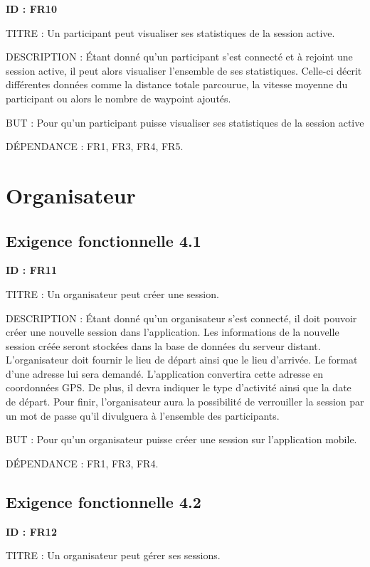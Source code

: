 \documentclass[titlepage, 12pt]{report}
\begin{document}
\textbf{ID : FR10}

TITRE : Un participant peut visualiser ses statistiques de la session active.

DESCRIPTION : Étant donné qu'un participant s'est connecté et à rejoint une session active, il peut alors visualiser l'ensemble de ses statistiques. Celle-ci décrit différentes données comme la distance totale parcourue, la vitesse moyenne du participant ou alors le nombre de waypoint ajoutés. 

BUT : Pour qu'un participant puisse visualiser ses statistiques de la session active

DÉPENDANCE : FR1, FR3, FR4, FR5.



\section{Organisateur}

\subsection{Exigence fonctionnelle 4.1}

\textbf{ID : FR11}

TITRE : Un organisateur peut créer une session.

DESCRIPTION : Étant donné qu'un organisateur s'est connecté, il doit pouvoir créer une nouvelle session dans l'application. Les informations de la nouvelle session créée seront stockées dans la base de données du serveur distant. L'organisateur doit fournir le lieu de départ ainsi que le lieu d'arrivée. Le format d'une adresse lui sera demandé. L'application convertira cette adresse en coordonnées GPS. De plus, il devra indiquer le type d'activité ainsi que la date de départ. Pour finir, l'organisateur aura la possibilité de verrouiller la session par un mot de passe qu'il divulguera à l'ensemble des participants.

BUT : Pour qu'un organisateur puisse créer une session sur l'application mobile.

DÉPENDANCE : FR1, FR3, FR4.

\subsection{Exigence fonctionnelle 4.2}

\textbf{ID : FR12}

TITRE : Un organisateur peut gérer ses sessions.
\end{document}
